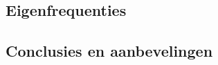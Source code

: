 \documentclass[a4paper]{article}
\begin{document}
\subsection{Eigenfrequenties}

\subsection{Conclusies en aanbevelingen}
\end{document}
